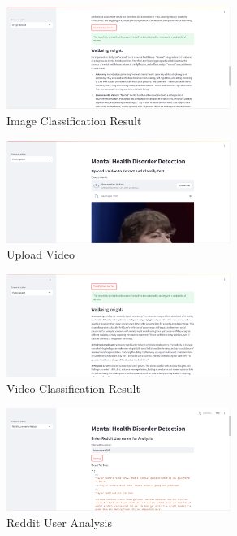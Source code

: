 \begin{figure}[h!]  
    \centering
    \includegraphics[width=0.65\textwidth]{App Images/05 Interface.png}  
    \caption{Image Classification Result}
    \label{05i}  %
\end{figure}


\begin{figure}[h!]  
    \centering
    \includegraphics[width=0.65\textwidth]{App Images/12 Interface.png}  
    \caption{Upload Video}
    \label{06i4}  %
\end{figure}

\begin{figure}[h!]  
    \centering
    \includegraphics[width=0.65\textwidth]{App Images/13 Interface.png}  
    \caption{Video Classification Result}
    \label{06i}  %
\end{figure}

\begin{figure}[h!]  
    \centering
    \includegraphics[width=0.65\textwidth]{App Images/06 Interface.png}  
    \caption{Reddit User Analysis}
    \label{07i}  %
\end{figure}

